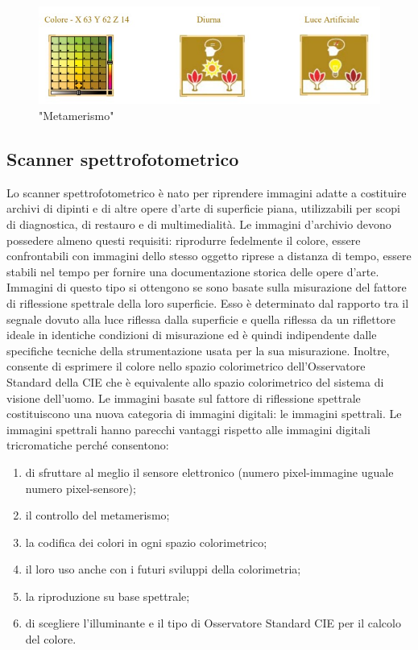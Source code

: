 \documentclass[a4paper,11pt]{article}
\begin{document}
        \begin{figure}[h]
        \centering
        \includegraphics[scale=0.8]{colorimetria2}
        \caption{"Metamerismo"}
        \end{figure}
        
        \newpage

        \subsection{Scanner spettrofotometrico}
        Lo scanner spettrofotometrico è nato per riprendere immagini adatte a
        costituire archivi di dipinti e di altre opere d’arte di superficie piana, utilizzabili per scopi di diagnostica, di
        restauro e di multimedialità. Le immagini d’archivio devono possedere almeno questi requisiti: riprodurre
        fedelmente il colore, essere confrontabili con immagini dello stesso oggetto riprese a distanza di tempo,
        essere stabili nel tempo per fornire una documentazione storica delle opere d’arte. Immagini di questo tipo si
        ottengono se sono basate sulla misurazione del fattore di riflessione spettrale della loro superficie. Esso è
        determinato dal rapporto tra il segnale dovuto alla luce riflessa dalla superficie e quella riflessa da un
        riflettore ideale in identiche condizioni di misurazione ed è quindi indipendente dalle specifiche tecniche
        della strumentazione usata per la sua misurazione. Inoltre, consente di esprimere il colore nello spazio
        colorimetrico dell’Osservatore Standard della CIE che è equivalente allo spazio colorimetrico del sistema di
        visione dell’uomo. Le immagini basate sul fattore di riflessione spettrale costituiscono una nuova categoria di
        immagini digitali: le immagini spettrali.
        Le immagini spettrali hanno parecchi vantaggi rispetto alle immagini digitali tricromatiche perché consentono:
        \begin{enumerate} 
             \item di sfruttare al meglio il sensore elettronico (numero pixel-immagine uguale numero pixel-sensore);
             \item il controllo del metamerismo;
             \item la codifica dei colori in ogni spazio colorimetrico;
             \item il loro uso anche con i futuri sviluppi della colorimetria;
             \item la riproduzione su base spettrale;
             \item di scegliere l’illuminante e il tipo di Osservatore Standard CIE per il calcolo del colore.
        \end{enumerate}
\end{document}
